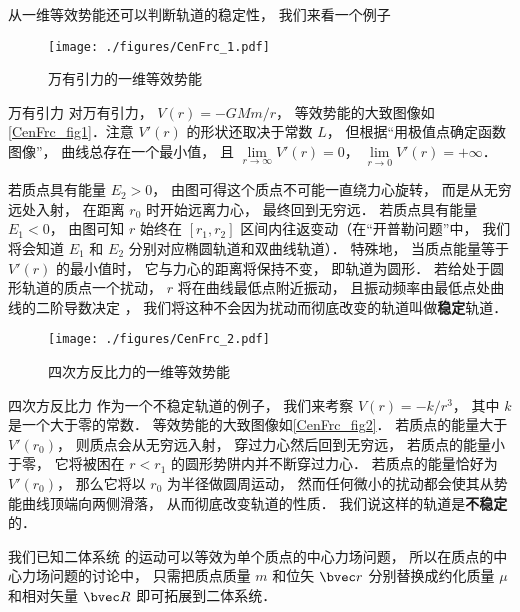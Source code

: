 从一维等效势能还可以判断轨道的稳定性， 我们来看一个例子

\begin{figure}[ht]
\centering
\texttt{[image: ./figures/CenFrc\_1.pdf]}
\caption{万有引力的一维等效势能} \label{CenFrc_fig1}
\end{figure}

\begin{example}{万有引力}
对万有引力， $V(r) = -GMm/r$， 等效势能的大致图像如\autoref{CenFrc_fig1}．注意 $V'(r)$ 的形状还取决于常数 $L$， 但根据“用极值点确定函数图像”， 曲线总存在一个最小值， 且 $\lim\limits_{r\to\infty}V'(r) = 0$， $\lim\limits_{r\to 0} V'(r) = +\infty$．

若质点具有能量 $E_2 > 0$， 由图可得这个质点不可能一直绕力心旋转， 而是从无穷远处入射， 在距离 $r_0$ 时开始远离力心， 最终回到无穷远． 若质点具有能量 $E_1 < 0$， 由图可知 $r$ 始终在 $[r_1, r_2]$ 区间内往返变动（在“开普勒问题”中， 我们将会知道 $E_1$ 和 $E_2$ 分别对应椭圆轨道和双曲线轨道）． 特殊地， 当质点能量等于 $V'(r)$ 的最小值时， 它与力心的距离将保持不变， 即轨道为圆形． 若给处于圆形轨道的质点一个扰动， $r$ 将在曲线最低点附近振动， 且振动频率由最低点处曲线的二阶导数决定%
， 我们将这种不会因为扰动而彻底改变的轨道叫做\textbf{稳定}轨道．
\end{example}

\begin{figure}[ht]
\centering
\texttt{[image: ./figures/CenFrc\_2.pdf]}
\caption{四次方反比力的一维等效势能} \label{CenFrc_fig2}
\end{figure}

\begin{example}{四次方反比力}
作为一个不稳定轨道的例子， 我们来考察 $V(r) = -k/r^3$， 其中 $k$ 是一个大于零的常数． 等效势能的大致图像如\autoref{CenFrc_fig2}． 若质点的能量大于 $V'(r_0)$， 则质点会从无穷远入射， 穿过力心然后回到无穷远， 若质点的能量小于零， 它将被困在 $r < r_1$ 的圆形势阱内并不断穿过力心． 若质点的能量恰好为 $V'(r_0)$， 那么它将以 $r_0$ 为半径做圆周运动， 然而任何微小的扰动都会使其从势能曲线顶端向两侧滑落， 从而彻底改变轨道的性质． 我们说这样的轨道是\textbf{不稳定}的．
\end{example}

我们已知二体系统 的运动可以等效为单个质点的中心力场问题， 所以在质点的中心力场问题的讨论中， 只需把质点质量 $m$ 和位矢 $\bvec r$ 分别替换成约化质量 $\mu$ 和相对矢量 $\bvec R$ 即可拓展到二体系统．

